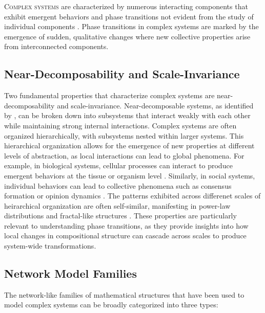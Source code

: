 \lettrine[lines=2, findent=3pt, nindent=0pt]{C}{omplex systems} are characterized by numerous interacting components that exhibit emergent behaviors and phase transitions not evident from the study of individual components \citep{mitchell2009complexity}. Phase transitions in complex systems are marked by the emergence of sudden, qualitative changes where new collective properties arise from interconnected components.

\subsection{Near-Decomposability and Scale-Invariance}

Two fundamental properties that characterize complex systems are near-decomposability and scale-invariance. Near-decomposable systems, as identified by \citet{simon1962architecture}, can be broken down into subsystems that interact weakly with each other while maintaining strong internal interactions. Complex systems are often organized hierarchically, with subsystems nested within larger systems. This hierarchical organization allows for the emergence of new properties at different levels of abstraction, as local interactions can lead to global phenomena. For example, in biological systems, cellular processes can interact to produce emergent behaviors at the tissue or organism level \citep{battiston2020networks}. Similarly, in social systems, individual behaviors can lead to collective phenomena such as consensus formation or opinion dynamics \citep{castellano2009statistical}. The patterns exhibited across differenet scales of heirarchical  organization are often self-similar, manifesting in power-law distributions and fractal-like structures \citep{west2017scale}. These properties are particularly relevant to understanding phase transitions, as they provide insights into how local changes in compositional structure can cascade across scales to produce system-wide transformations.

\subsection{Network Model Families}

The network-like families of mathematical structures that have been used to model complex systems can be broadly categorized into three types:

